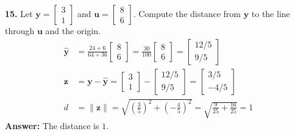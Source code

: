 \documentclass[11pt, letterpaper]{article}
\theoremstyle{definition}
\theoremstyle{remark}
\begin{document}
\textbf{15.} Let $\mathbf{y} = \begin{bmatrix} 3 \\ 1 \end{bmatrix}$ and $\mathbf{u} = \begin{bmatrix} 8 \\ 6 \end{bmatrix}$. Compute the distance from $\mathbf{y}$ to the line through $\mathbf{u}$ and the origin.
\begin{align*}
    \hat{\mathbf{y}} &= \frac{24 + 6}{64 + 36} \begin{bmatrix} 8 \\ 6 \end{bmatrix} = \frac{30}{100} \begin{bmatrix} 8 \\ 6 \end{bmatrix} = \begin{bmatrix} 12/5 \\ 9/5 \end{bmatrix} \\
    \mathbf{z} &= \mathbf{y} - \hat{\mathbf{y}} = \begin{bmatrix} 3 \\ 1 \end{bmatrix} - \begin{bmatrix} 12/5 \\ 9/5 \end{bmatrix} = \begin{bmatrix} 3/5 \\ -4/5 \end{bmatrix} \\
    d &= \|\mathbf{z}\| = \sqrt{\left(\frac{3}{5}\right)^2 + \left(-\frac{4}{5}\right)^2} = \sqrt{\frac{9}{25} + \frac{16}{25}} = 1
\end{align*}
\textbf{Answer:} The distance is $1$.
\end{document}
